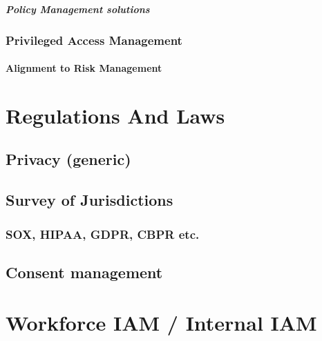 \hypertarget{policy-management-solutions}{%
\paragraph{Policy Management
solutions}\label{policy-management-solutions}}

\hypertarget{privileged-access-management}{%
\subsection{Privileged Access
Management}\label{privileged-access-management}}

\hypertarget{alignment-to-risk-management}{%
\subsubsection{Alignment to Risk
Management}\label{alignment-to-risk-management}}

\hypertarget{regulations-and-laws}{%
\chapter{Regulations And Laws}\label{regulations-and-laws}}

\hypertarget{privacy-generic}{%
\section{Privacy (generic)}\label{privacy-generic}}

\hypertarget{survey-of-jurisdictions}{%
\section{Survey of Jurisdictions}\label{survey-of-jurisdictions}}

\hypertarget{sox-hipaa-gdpr-cbpr-etc.}{%
\subsection{SOX, HIPAA, GDPR, CBPR
etc.}\label{sox-hipaa-gdpr-cbpr-etc.}}

\hypertarget{consent-management}{%
\section{Consent management}\label{consent-management}}

\hypertarget{workforce-iam-internal-iam}{%
\chapter{Workforce IAM / Internal
IAM}\label{workforce-iam-internal-iam}}

